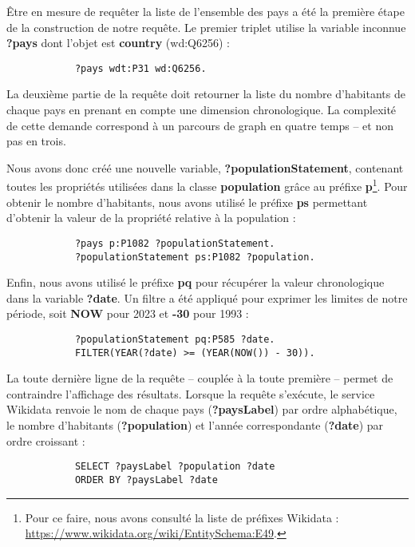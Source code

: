 \documentclass[hidelinks, 12pt]{article}
\begin{document}
		Être en mesure de requêter la liste de l'ensemble des pays a été la première étape de la construction de notre requête. Le premier triplet utilise la variable inconnue \textbf{?pays} dont l'objet est \textbf{country} (wd:Q6256) :
		
		\begin{verbatim}
			?pays wdt:P31 wd:Q6256.
		\end{verbatim}
		
		La deuxième partie de la requête doit retourner la liste du nombre d'habitants de chaque pays en prenant en compte une dimension chronologique. La complexité de cette demande correspond à un parcours de graph en quatre temps -- et non pas en trois.
		
		Nous avons donc créé une nouvelle variable, \textbf{?populationStatement}, contenant toutes les propriétés utilisées dans la classe \textbf{population} grâce au préfixe \textbf{p}\footnote{Pour ce faire, nous avons consulté la liste de préfixes Wikidata : \url{https://www.wikidata.org/wiki/EntitySchema:E49}.}. Pour obtenir le nombre d'habitants, nous avons utilisé le préfixe \textbf{ps} permettant d'obtenir la valeur de la propriété relative à la population :
		
		\begin{verbatim}
			?pays p:P1082 ?populationStatement.
			?populationStatement ps:P1082 ?population.
		\end{verbatim}
		
		Enfin, nous avons utilisé le préfixe \textbf{pq} pour récupérer la valeur chronologique dans la variable \textbf{?date}. Un filtre a été appliqué pour exprimer les limites de notre période, soit \textbf{NOW} pour 2023 et \textbf{-30} pour 1993 :
		
		\begin{verbatim}
			?populationStatement pq:P585 ?date.
			FILTER(YEAR(?date) >= (YEAR(NOW()) - 30)).
		\end{verbatim}
		
		La toute dernière ligne de la requête -- couplée à la toute première -- permet de contraindre l'affichage des résultats. Lorsque la requête s'exécute, le service Wikidata renvoie le nom de chaque pays (\textbf{?paysLabel}) par ordre alphabétique, le nombre d'habitants (\textbf{?population}) et l'année correspondante (\textbf{?date}) par ordre croissant :
		
		\begin{verbatim}
			SELECT ?paysLabel ?population ?date
			ORDER BY ?paysLabel ?date
		\end{verbatim}
		
\end{document}
